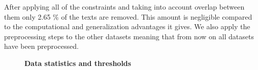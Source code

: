 After applying all of the constraints and taking into account overlap between
them only 2.65 \% of the texts are removed. This amount is negligible
compared to the computational and generalization advantages it gives. We also
apply the preprocessing steps to the other datasets meaning that from now on
all datasets have been preprocessed.

\begin{figure}[htb]
    \centering
    \textbf{Data statistics and thresholds}\\
    \begin{minipage}{.5\linewidth}
        \centering
    \end{minipage}%
    \begin{minipage}{.5\linewidth}
        \centering
\end{minipage}
\end{figure}
